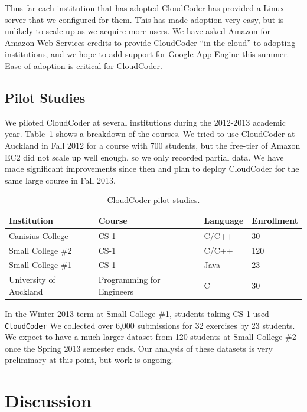 \documentclass{sig-alternate}
\begin{document}
Thus far each institution that has adopted CloudCoder has
provided a Linux server that we configured for them.  This has made
adoption very easy, but is unlikely to scale up as we acquire more
users.  We have asked Amazon for Amazon Web Services credits to
provide CloudCoder ``in the cloud'' to adopting institutions, and we
hope to add support for Google App Engine this summer.  Ease of
adoption is critical for CloudCoder.

\subsection{Pilot Studies}

We piloted CloudCoder at several institutions during the 2012-2013
academic year.  Table~\ref{tab:courses} shows a breakdown of the
courses.  We tried to use CloudCoder at Auckland in Fall 2012 for a
course with 700 students, but the free-tier of Amazon EC2 did not
scale up well enough, so we only recorded partial data.  We have made
significant improvements since then and plan to deploy CloudCoder for
the same large course in Fall 2013.


\begin{table}
\centering
\begin{tabular}{| l | l | l | l |}
\hline
Institution & Course & Language & Enrollment\\
\hline
Canisius College & CS-1 & C/C++ & 30\\
Small College \#2 & CS-1 & C/C++ & 120\\
Small College \#1 & CS-1 & Java & 23\\
University of Auckland & Programming for Engineers & C & 30\\
\hline
\end{tabular}
\caption{CloudCoder pilot studies.}
\label{tab:courses}
\end{table}

In the Winter 2013 term at Small College \#1, students taking CS-1 used {\tt CloudCoder}
%
% 
We collected over 6,000 submissions
for 32 exercises by 23 students.  We expect to have a much larger
dataset from 120 students at 
Small College \#2
once the Spring 2013 semester ends.  Our analysis of these datasets is
very preliminary at this point, but work is ongoing.


\section{Discussion}
\end{document}
